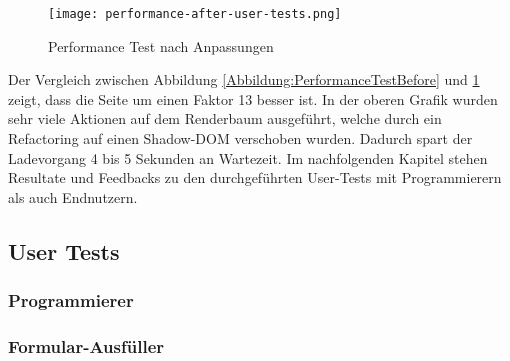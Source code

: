 \begin{figure}[!htb]
    \centering
    \texttt{[image: performance-after-user-tests.png]}
    \caption{Performance Test nach Anpassungen}
    \label{Abbildung:PerformanceTestAfter}
\end{figure}

Der Vergleich zwischen Abbildung \ref{Abbildung:PerformanceTestBefore} und \ref{Abbildung:PerformanceTestAfter} zeigt, dass die Seite um einen Faktor 13 besser ist.
In der oberen Grafik wurden sehr viele Aktionen auf dem Renderbaum ausgeführt, welche durch ein Refactoring auf einen Shadow-DOM verschoben wurden.
Dadurch spart der Ladevorgang 4 bis 5 Sekunden an Wartezeit.
Im nachfolgenden Kapitel stehen Resultate und Feedbacks zu den durchgeführten User-Tests mit Programmierern als auch Endnutzern.


\subsection{User Tests}


\subsubsection{Programmierer}



\subsubsection{Formular-Ausfüller}





